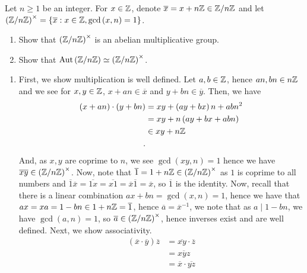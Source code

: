 \documentclass[a4paper]{article}
\begin{document}
\newpage
\begin{problem}[2]
	Let \(n \ge 1 \) be an integer. For \( x \in \mathbb{Z}\), denote \(\overline{x} = x + n\mathbb{Z} \in \mathbb{Z} / n\mathbb{Z}\) and let \(\left( \mathbb{Z} / n\mathbb{Z} \right)^{\times} = \{\overline{x} : x \in \mathbb{Z}, \gcd\left( x, n \right) = 1\}  \).
	\begin{enumerate}
		\item Show that \(\left( \mathbb{Z} / n\mathbb{Z} \right)^{\times} \) is an abelian multiplicative group.
		\item Show that \(\operatorname{Aut}\left( \mathbb{Z} / n\mathbb{Z} \right) \simeq \left( \mathbb{Z} / n\mathbb{Z} \right)^{\times} \).
	\end{enumerate}
\end{problem}
\begin{solution}
	\begin{enumerate}
		\item First, we show multiplication is well defined. Let \(a, b \in \mathbb{Z}\), hence \(an, bn \in n\mathbb{Z}\) and we see for \(x, y \in \mathbb{Z}\), \(x + an \in \overline{x}\) and \(y + bn \in \overline{y}\). Then, we have
			\begin{align*}
				\left( x + an \right)  \cdot \left( y + bn \right) &=  xy + \left( ay + bx \right) n + abn^2  \\
										   &= xy + n\left( ay + bx + abn \right)  \\
										   &\in xy + n\mathbb{Z} \\
			.\end{align*}
			And, as \(x, y \) are coprime to \(n\), we see \(\gcd\left( xy, n \right) = 1\) hence we have \(\overline{xy} \in \left( \mathbb{Z} / n\mathbb{Z} \right)^{\times} \). Now, note that \(\overline{1} = 1 + n\mathbb{Z} \in \left( \mathbb{Z} / n\mathbb{Z} \right)^{\times} \) as \(1\) is coprime to all numbers and \(\overline{1}\overline{x} = \overline{1x} =  \overline{x1} = \overline{x}\overline{1}= \overline{x}\), so \(\overline{1}\) is the identity. Now, recall that there is a linear combination \(ax + bn = \gcd\left( x, n \right) = 1\), hence we have that \(ax = xa = 1 - bn \in 1 + n\mathbb{Z} = \overline{1}\), hence \(\overline{a} = \overline{x}^{-1}\), we note that as \(a \mid 1-bn\), we have  \(\gcd\left( a, n \right) = 1 \), so \(\overline{a} \in \left( \mathbb{Z} / n\mathbb{Z} \right)^{\times} \), hence inverses exist and are well defined. Next, we show associativity.			\begin{align*}
				\left( \overline{x} \cdot \overline{y} \right) \overline{z} &= \overline{xy} \cdot \overline{z}\\
				&= \overline{xyz} \\
				&= \overline{x} \cdot \overline{yz} \\

\end{align*}
\end{enumerate}
\end{solution}
\end{document}
